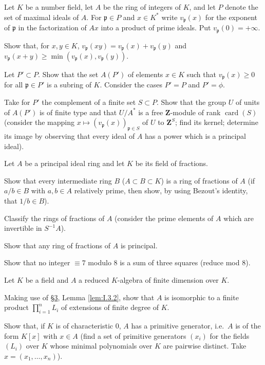  Let $K$ be a number field, let $A$ be the ring of integers of
$K$, and let $P$ denote the set of maximal ideals of $A$. For
$\mathfrak{p}\in P$ and $x\in K^{*}$ write
$v_{\mathfrak{p}}(x)$ for the exponent of $\mathfrak{p}$ in the
factorization of $Ax$ into a product of prime ideals. Put
$v_{\mathfrak{p}}(0)=+\infty$.
\begin{alist}
\item Show that, for $x,y\in K$,
$v_{\mathfrak{p}}(xy)=v_{\mathfrak{p}}(x)+v_{\mathfrak{p}}(y)$ and
$v_{\mathfrak{p}}(x+y)\geq\min(v_{\mathfrak{p}}(x),v_{\mathfrak{p}}(y))$.
\item Let $P'\subset P$. Show that the set $A(P')$ of elements $x\in K$
such that $v_{\mathfrak{p}}(x)\geq0$ for all $\mathfrak{p}\in P'$ is a
subring of $K$. Consider the cases $P'=P$ and $P'=\phi$.
\item Take for $P'$ the complement of a finite set $S\subset P$. Show that
the group $U$ of units of $A(P')$ is of finite type and that $U/A^{*}$ is a
free $\mathbf{Z}$-module of rank $\operatorname{card}(S)$ (consider the
mapping $x\mapsto(v_{\mathfrak{p}}(x))_{\mathfrak{p}\in S}$ of $U$ to
$\mathbf{Z}^{S}$; find its kernel; determine its image by observing that
every ideal of $A$ has a power which is a principal ideal).
\end{alist}



 Let $A$ be a principal ideal ring and let $K$ be its field of
fractions.
\begin{alist}
\item Show that every intermediate ring $B$ ($A\subset B\subset K$) is a
ring of fractions of $A$ (if $a/b\in B$ with $a,b\in A$ relatively prime,
then show, by using Bezout's identity, that $1/b\in B$).
\item Classify the rings of fractions of $A$ (consider the prime elements of
$A$ which are invertible in $S^{-1}A$).
\item Show that any ring of fractions of $A$ is principal.
\end{alist}

 Show that no integer $\equiv7$ modulo $8$ is a sum of three
squares (reduce mod $8$).

 Let $K$ be a field and $A$ a reduced $K$-algebra of finite
dimension over $K$.
\begin{alist}
\item Making use of \hyperref[sec:5.3]{§3}, Lemma \ref{lem:I.3.2}, show that $A$ is isomorphic
to a finite product $\prod_{i=1}^{n}L_{i}$ of extensions of finite degree of
$K$.
\item Show that, if $K$ is of characteristic $0$, $A$ has a primitive
generator, i.e.\ $A$ is of the form $K[x]$ with $x\in A$ (find a set of
primitive generators $(x_{i})$ for the fields $(L_{i})$ over $K$ whose
minimal polynomials over $K$ are pairwise distinct. Take
$x=(x_{1},\ldots,x_{n})$).
\end{alist}

